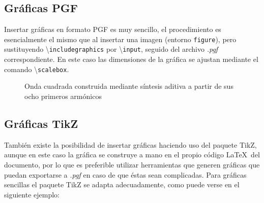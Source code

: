 \documentclass[a4paper, 11pt, spanish, twoside]{article}
\begin{document}
\subsection{Gráficas PGF}

Insertar gráficas en formato PGF es muy sencillo, el procedimiento es esencialmente el mismo que al insertar una imagen (entorno \texttt{figure}), pero sustituyendo \textbackslash\texttt{includegraphics} por \textbackslash\texttt{input}, seguido del archivo \textit{.pgf} correspondiente. En este caso las dimensiones de la gráfica se ajustan mediante el comando \textbackslash\texttt{scalebox}. 

\begin{figure}[H]
    \centering
    \caption{Onda cuadrada construida mediante síntesis aditiva a partir de sus ocho primeros armónicos}
    \label{fig:ondacuadrada}
\end{figure}


\subsection{Gráficas TikZ} \label{sec:graficastikz}

También existe la posibilidad de insertar gráficas haciendo uso del paquete TikZ, aunque en este caso la gráfica se construye a mano en el propio código \LaTeX \ del documento, por lo que es preferible utilizar herramientas que generen gráficas que puedan exportarse a \textit{.pgf} en caso de que éstas sean complicadas. Para gráficas sencillas el paquete TikZ se adapta adecuadamente, como puede verse en el siguiente ejemplo:

\vspace{5pt}
\end{document}
